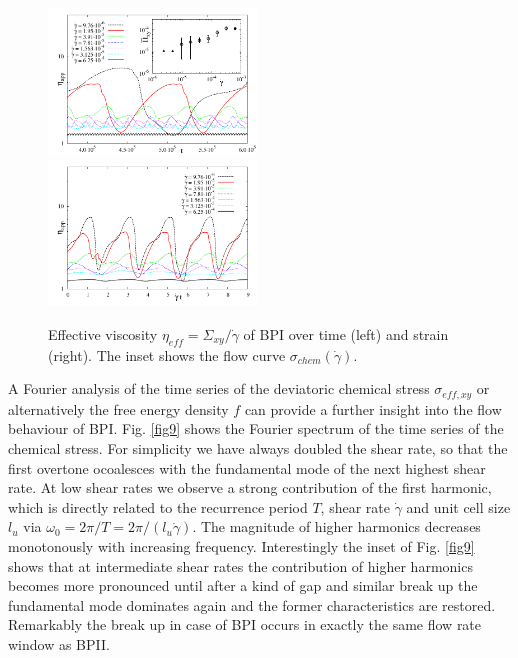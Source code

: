 \documentclass[aps,pre,reprint,superscriptaddress]{revtex4}
\begin{document}
\begin{figure}[h]
\includegraphics[width=0.495\textwidth]{stress_bp1.pdf}
\includegraphics[width=0.495\textwidth]{stress_vs_strain_bp1.pdf}
\caption{Effective viscosity $\eta_{eff}=\Sigma_{xy}/\dot{\gamma}$ of BPI over time (left) and strain (right). The inset shows the flow curve $\sigma_{chem}(\dot{\gamma})$.}
\label{bp1-rheo}
\end{figure}

A Fourier analysis of the time series of the deviatoric chemical stress $\sigma_{eff,xy}$ or alternatively the free energy density $f$ can provide a further insight into the flow behaviour of BPI.
Fig. \ref{fig9} shows the Fourier spectrum of the time series of the chemical stress.
For simplicity we have always doubled the shear rate, so that the first overtone ocoalesces with the fundamental mode of the next highest shear rate. 
At low shear rates we observe a strong contribution of the first harmonic, which is directly related to the recurrence period $T$, shear rate $\dot{\gamma}$ and unit cell size $l_{u}$ via $\omega_0=2\pi/T=2\pi/(l_{u}\dot{\gamma})$.
The magnitude of higher harmonics decreases monotonously with increasing frequency.
Interestingly the inset of Fig. \ref{fig9} shows that at intermediate shear rates the contribution of higher harmonics becomes more pronounced until after a kind of gap and similar break up the fundamental mode dominates again and the former characteristics are restored.
Remarkably the break up in case of BPI occurs in exactly the same flow rate window as BPII.
\end{document}
